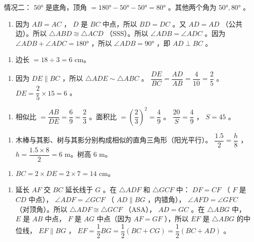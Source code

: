 \begin{answer}
   情况二： $50°$ 是底角，顶角 $= 180° - 50° - 50° = 80°$ 。其他两个角为 $50°, 80°$ 。

\begin{enumerate}
  \item 因为 $AB = AC$ ， $D$ 是 $BC$ 中点，所以 $BD = DC$ 。又 $AD = AD$ （公共边）。所以 $\triangle ABD \cong \triangle ACD$ （SSS）。所以 $\angle ADB = \angle ADC$ 。因为 $\angle ADB + \angle ADC = 180°$ ，所以 $\angle ADB = 90°$ ，即 $AD \perp BC$ 。
\end{enumerate}


\begin{enumerate}
  \item 边长 $= 18 \div 3 = 6$ cm。
\end{enumerate}


\begin{enumerate}
  \item 因为 $DE \parallel BC$ ，所以 $\triangle ADE \sim \triangle ABC$ 。 $\dfrac{DE}{BC} = \dfrac{AD}{AB} = \dfrac{4}{10} = \dfrac{2}{5}$ 。 $DE = \dfrac{2}{5} \times 15 = 6$ 。
\end{enumerate}


\begin{enumerate}
  \item 相似比 $= \dfrac{AB}{DE} = \dfrac{6}{9} = \dfrac{2}{3}$ 。面积比 $= \left(\dfrac{2}{3}\right)^2 = \dfrac{4}{9}$ 。 $\dfrac{20}{S} = \dfrac{4}{9}$ ， $S = 45$ 。
\end{enumerate}


\begin{enumerate}
  \item 木棒与其影、树与其影分别构成相似的直角三角形（阳光平行）。 $\dfrac{1.5}{2} = \dfrac{h}{8}$ ， $h = \dfrac{1.5 \times 8}{2} = 6$ m。树高 $6$ m。
\end{enumerate}


\begin{enumerate}
  \item $BC = 2 \times DE = 2 \times 7 = 14$ cm。
\end{enumerate}


\begin{enumerate}
  \item 延长 $AF$ 交 $BC$ 延长线于 $G$ 。在 $\triangle ADF$ 和 $\triangle GCF$ 中： $DF = CF$ （ $F$ 是 $CD$ 中点）， $\angle ADF = \angle GCF$ （ $AD \parallel BG$ ，内错角）， $\angle AFD = \angle GFC$ （对顶角）。所以 $\triangle ADF \cong \triangle GCF$ （ASA）， $AD = GC$ 。在 $\triangle ABG$ 中， $E$ 是 $AB$ 中点， $F$ 是 $AG$ 中点（因为 $AF = GF$ ），所以 $EF$ 是 $\triangle ABG$ 的中位线， $EF \parallel BG$ ， $EF = \dfrac{1}{2}BG = \dfrac{1}{2}(BC + CG) = \dfrac{1}{2}(BC + AD)$ 。
\end{enumerate}


\end{answer}
